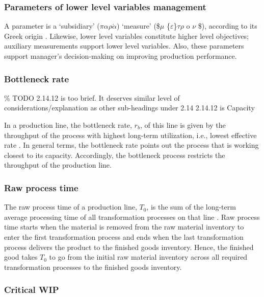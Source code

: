 \documentclass{article}
\begin{document}
\subsubsection{Parameters of lower level variables management}
\label{sec:org36d895b}

A parameter is a `subsidiary' (\(\pi\alpha \rho\acute{\alpha}\)) `measure' (\$\(\mu\) \textasciiacute{}\{\(\varepsilon\)\}\(\tau \rho\) o \(\nu\) \$), according to its Greek origin \citep{LSJcontributors2013}.
Likewise, lower level variables constitute higher level objectives; auxiliary measurements support lower level variables.
Also, these parameters support manager's decision-making on improving production performance.

\subsubsection{Bottleneck rate}
\label{sec:org6d7914a}

\% TODO 2.14.12 is too brief. It deserves similar level of considerations/explanation as other sub-headings under 2.14 2.14.12 is Capacity


In a production line, the bottleneck rate, \(r_b\), of this line is given by the throughput of the process with highest long-term utilization, i.e., lowest effective rate \citep[p.218]{Hopp2001}.
In general terms, the bottleneck rate points out the process that is working closest to its capacity.
Accordingly, the bottleneck process restricts the throughput of the production line.

\subsubsection{Raw process time}
\label{sec:org7084a71}

The raw process time of a production line, \(T_0\), is the sum of the long-term average processing time of all transformation processes on that line \citep{Hopp2001}.
Raw process time starts when the material is removed from the raw material inventory to enter the first transformation process and ends when the last transformation process delivers the product to the finished goods inventory.
Hence, the finished good takes \(T_0\) to go from the initial raw material inventory across all required transformation processes to the finished goods inventory.

\subsubsection{Critical WIP}
\label{sec:orge7d93f6}
\end{document}
